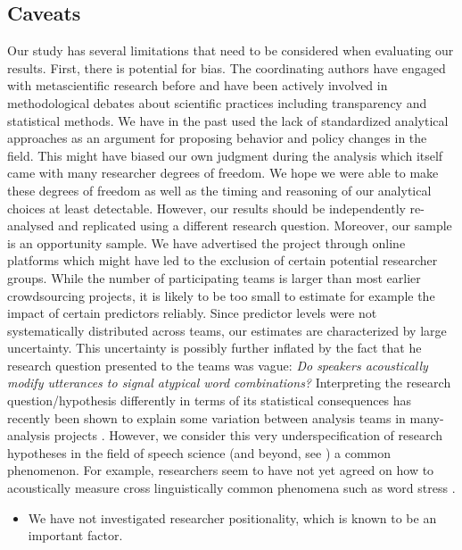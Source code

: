 \documentclass[Review,times,sageh]{sagej}
\providecommand{\tightlist}{\setlength{\itemsep}{0pt}\setlength{\parskip}{0pt}}
\begin{document}
\hypertarget{caveats}{%
\subsection{Caveats}\label{caveats}}

Our study has several limitations that need to be considered when evaluating our results.
First, there is potential for bias.
The coordinating authors have engaged with metascientific research before and have been actively involved in methodological debates about scientific practices including transparency and statistical methods.
We have in the past used the lack of standardized analytical approaches as an argument for proposing behavior and policy changes in the field.
This might have biased our own judgment during the analysis which itself came with many researcher degrees of freedom.
We hope we were able to make these degrees of freedom as well as the timing and reasoning of our analytical choices at least detectable.
However, our results should be independently re-analysed and replicated using a different research question.
Moreover, our sample is an opportunity sample.
We have advertised the project through online platforms which might have led to the exclusion of certain potential researcher groups.
While the number of participating teams is larger than most earlier crowdsourcing projects, it is likely to be too small to estimate for example the impact of certain predictors reliably.
Since predictor levels were not systematically distributed across teams, our estimates are characterized by large uncertainty.
This uncertainty is possibly further inflated by the fact that he research question presented to the teams was vague: \emph{Do speakers acoustically modify utterances to signal atypical word combinations?}
Interpreting the research question/hypothesis differently in terms of its statistical consequences has recently been shown to explain some variation between analysis teams in many-analysis projects \citep{auspurg2021has}.
However, we consider this very underspecification of research hypotheses in the field of speech science (and beyond, see \citet{scheel2022most}) a common phenomenon.
For example, researchers seem to have not yet agreed on how to acoustically measure cross linguistically common phenomena such as word stress \citep[e.g.][]{gordon2017acoustic}.

\begin{itemize}
\tightlist
\item
  We have not investigated researcher positionality, which is known to be an important factor.
\end{itemize}
\end{document}
